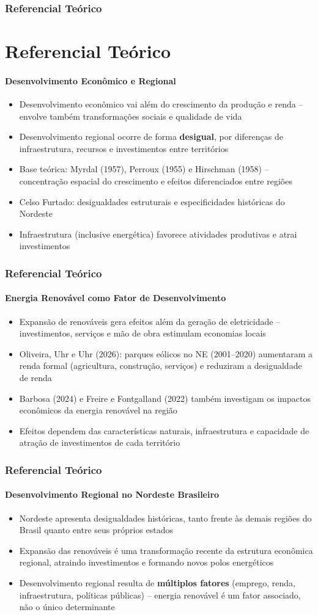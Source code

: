 \documentclass[11pt]{beamer}
\begin{document}
\begin{frame}
\frametitle{Referencial Teórico}
\section{Referencial Teórico}
\framesubtitle{Desenvolvimento Econômico e Regional}
\begin{itemize}
    \item Desenvolvimento econômico vai além do crescimento da produção e renda -- envolve também transformações sociais e qualidade de vida
    \item Desenvolvimento regional ocorre de forma \textbf{desigual}, por diferenças de infraestrutura, recursos e investimentos entre territórios
    \item Base teórica: Myrdal (1957), Perroux (1955) e Hirschman (1958) -- concentração espacial do crescimento e efeitos diferenciados entre regiões
    \item Celso Furtado: desigualdades estruturais e especificidades históricas do Nordeste
    \item Infraestrutura (inclusive energética) favorece atividades produtivas e atrai investimentos
\end{itemize}
\end{frame}
\begin{frame}
\frametitle{Referencial Teórico}
\framesubtitle{Energia Renovável como Fator de Desenvolvimento}
\begin{itemize}
    \item Expansão de renováveis gera efeitos além da geração de eletricidade -- investimentos, serviços e mão de obra estimulam economias locais
    \item Oliveira, Uhr e Uhr (2026): parques eólicos no NE (2001--2020) aumentaram a renda formal (agricultura, construção, serviços) e reduziram a desigualdade de renda
    \item Barbosa (2024) e Freire e Fontgalland (2022) também investigam os impactos econômicos da energia renovável na região
    \item Efeitos dependem das características naturais, infraestrutura e capacidade de atração de investimentos de cada território
\end{itemize}
\end{frame}
\begin{frame}
\frametitle{Referencial Teórico}
\framesubtitle{Desenvolvimento Regional no Nordeste Brasileiro}
\begin{itemize}
    \item Nordeste apresenta desigualdades históricas, tanto frente às demais regiões do Brasil quanto entre seus próprios estados
    \item Expansão das renováveis é uma transformação recente da estrutura econômica regional, atraindo investimentos e formando novos polos energéticos
    \item Desenvolvimento regional resulta de \textbf{múltiplos fatores} (emprego, renda, infraestrutura, políticas públicas) -- energia renovável é um fator associado, não o único determinante
\end{itemize}
\end{frame}
\end{document}
